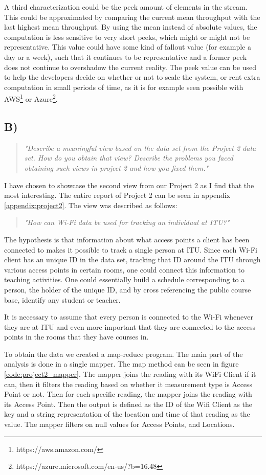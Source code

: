 \newpar A third characterization could be the peek amount of elements in the stream. This could be approximated by comparing the current mean throughput with the last highest mean throughput. By using the mean instead of absolute values, the computation is less sensitive to very short peeks, which might or might not be representative. This value could have some kind of fallout value (for example a day or a week), such that it continues to be representative and a former peek does not continue to overshadow the current reality. The peek value can be used to help the developers decide on whether or not to scale the system, or rent extra computation in small periods of time, as it is for example seen possible with AWS\footnote{https://aws.amazon.com/} or Azure\footnote{https://azure.microsoft.com/en-us/?b=16.48}.

\subsection{B)}
\begin{quote}
		\textit{"Describe	a	meaningful	view	based	on	the	data	set	from	the	Project	2	data	set.	How	do	you	obtain	that	view?	Describe	the	problems	you	faced	obtaining	such	views	in	project	2	and	how	you	fixed	them."}
\end{quote}
I have chosen to showcase the second view from our Project 2 as I find that the most interesting. The entire report of Project 2 can be seen in appendix \ref{appendix:project2}. The view was described as follows: 
\begin{quote}
	\textit{"How can Wi-Fi data be used for tracking an individual at ITU?"}
\end{quote}
The hypothesis is that information about what access points a client has been connected to makes it possible to track a single person at ITU. Since each Wi-Fi client has an unique ID in the data set, tracking that ID around the ITU through various access points in certain rooms, one could connect this information to teaching activities. One could essentially build a schedule corresponding to a person, the holder of the unique ID, and by cross referencing the public course base, identify any student or teacher. 

It is necessary to assume that every person is connected to the Wi-Fi whenever they are at ITU and even more important that they are connected to the access points in the rooms that they have courses in. 

\newpar To obtain the data we created a map-reduce program. The main part of the analysis is done in a single mapper. The map method can be seen in figure \ref{code:project2_mapper}. The mapper joins the reading with its WiFi Client if it can, then it filters the reading based on whether it measurement type is Access Point or not. Then for each specific reading, the mapper joins the reading with its Access Point. Then the output is defined as the ID of the Wifi Client as the key and a string representation of the location and time of that reading as the value. The mapper filters on null values for Access Points, and Locations.

